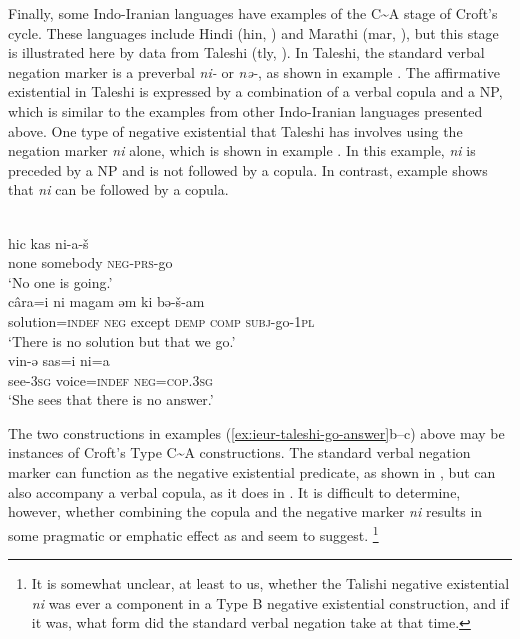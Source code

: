 ﻿\documentclass[output=paper]{langsci/langscibook}
\begin{document}
Finally, some Indo-Iranian languages have examples of the
C{\textasciitilde}A stage of Croft's cycle. These languages include
Hindi (hin, \citealt{Bashir2006}) and Marathi (mar,
\citealt{Croft1991}), but this stage is illustrated here by data from
Taleshi (tly, \citealt{Paul2011}). In Taleshi, the standard
verbal negation marker is a preverbal \textit{ni-} or
\textit{nə-}, as shown in example . The affirmative
existential in Taleshi is expressed by a combination of a verbal copula and
a NP, which is similar to the examples from other Indo-Iranian languages
presented above. One type of negative existential that Taleshi has involves
using the negation marker \textit{ni} alone, which is shown in example
. In this example, \textit{ni} is preceded
by a NP and is not followed by a copula. In contrast, example
 shows that \textit{ni} can be followed
by a copula.
%
\begin{exe}\ex\label{ex:ieur-taleshi-go-answer}
\begin{xlist}
\ex\label{ex:ieur-taleshi-nobodygoes}
\\
    \gll hic kas ni-a-š \\
none somebody \textsc{neg}-\textsc{prs}-go \\
    \glt
`No one is going.'
\ex\label{ex:ieur-taleshi-nosolution}
\\
\gll câra=i ni magam əm ki bə-š-am\\
solution=\textsc{indef} \textsc{neg} except \textsc{demp} \textsc{comp}
\textsc{subj}-go-\textsc{1pl}\\
\glt `There is no solution but that we go.'
\ex\label{ex:ieur-taleshi-noanswer}
\\
\gll vin-ə sas=i ni=a\\
see-\textsc{3sg} voice=\textsc{indef}  \textsc{neg=cop.3sg}\\
\glt `She sees that there is no answer.'
    \end{xlist}\end{exe}

The two constructions in examples (\ref{ex:ieur-taleshi-go-answer}b--c)
above may be instances of Croft's Type C{\textasciitilde}A constructions.
The standard verbal negation marker can function as the negative
existential predicate, as shown in , but can
also accompany a verbal copula, as it does in
. It is difficult to determine, however,
whether combining the copula and the negative marker \textit{ni} results in
some pragmatic or emphatic effect as \citet{Croft1991} and
\citet{Veselinova2014} seem to suggest.%
%
\footnote{It is somewhat unclear, at least to us, whether the Talishi negative existential \textit{ni} was ever a component in a Type B negative existential construction, and if it was, what form did the standard verbal negation take at that time.}
\end{document}
